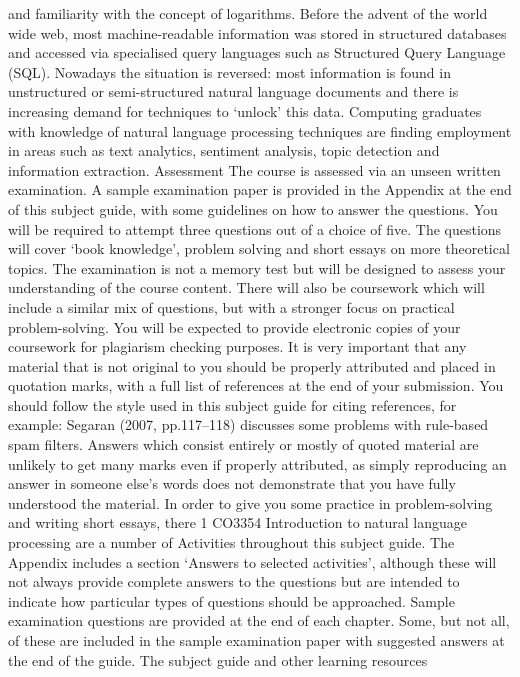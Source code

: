 and familiarity with the concept of logarithms.
Before the advent of the world wide web, most machine-readable information was
stored in structured databases and accessed via specialised query languages such as
Structured Query Language (SQL). Nowadays the situation is reversed: most
information is found in unstructured or semi-structured natural language documents
and there is increasing demand for techniques to ‘unlock’ this data. Computing
graduates with knowledge of natural language processing techniques are finding
employment in areas such as text analytics, sentiment analysis, topic detection and
information extraction.
Assessment
The course is assessed via an unseen written examination. A sample examination
paper is provided in the Appendix at the end of this subject guide, with some
guidelines on how to answer the questions. You will be required to attempt three
questions out of a choice of five. The questions will cover ‘book knowledge’, problem
solving and short essays on more theoretical topics. The examination is not a
memory test but will be designed to assess your understanding of the course
content. There will also be coursework which will include a similar mix of questions,
but with a stronger focus on practical problem-solving.
You will be expected to provide electronic copies of your coursework for plagiarism
checking purposes. It is very important that any material that is not original to you
should be properly attributed and placed in quotation marks, with a full list of
references at the end of your submission. You should follow the style used in this
subject guide for citing references, for example:
Segaran (2007, pp.117–118) discusses some problems with rule-based spam filters.
Answers which consist entirely or mostly of quoted material are unlikely to get many
marks even if properly attributed, as simply reproducing an answer in someone
else’s words does not demonstrate that you have fully understood the material.
In order to give you some practice in problem-solving and writing short essays, there
1
CO3354 Introduction to natural language processing
are a number of Activities throughout this subject guide. The Appendix includes a
section ‘Answers to selected activities’, although these will not always provide
complete answers to the questions but are intended to indicate how particular types
of questions should be approached. Sample examination questions are provided at
the end of each chapter. Some, but not all, of these are included in the sample
examination paper with suggested answers at the end of the guide.
The subject guide and other learning resources
